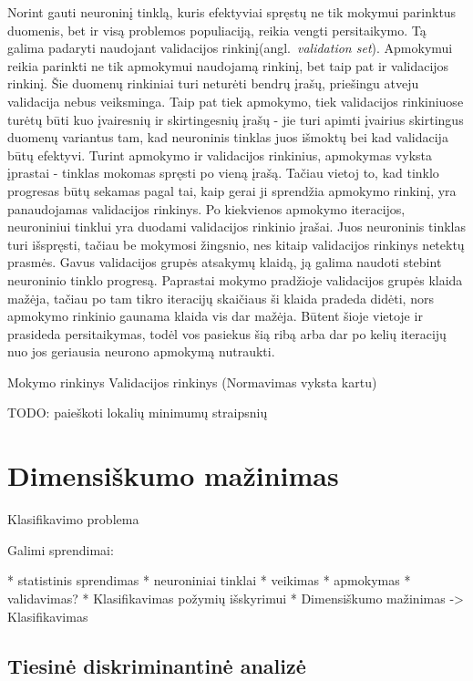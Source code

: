 \documentclass{VUMIFPSbakalaurinis}
\newcommand{\TODO}[1]{
\colorbox{todo-background-color}{TODO: #1}
}
\begin{document}
Norint gauti neuroninį tinklą, kuris efektyviai spręstų ne tik mokymui parinktus duomenis, bet ir visą problemos populiaciją, reikia vengti persitaikymo.
Tą galima padaryti naudojant validacijos rinkinį(angl.~\textit{validation set}).
Apmokymui reikia parinkti ne tik apmokymui naudojamą rinkinį, bet taip pat ir validacijos rinkinį.
Šie duomenų rinkiniai turi neturėti bendrų įrašų, priešingu atveju validacija nebus veiksminga.
Taip pat tiek apmokymo, tiek validacijos rinkiniuose turėtų būti kuo įvairesnių ir skirtingesnių įrašų - jie turi apimti įvairius skirtingus duomenų variantus tam, kad neuroninis tinklas juos išmoktų bei kad validacija būtų efektyvi.
Turint apmokymo ir validacijos rinkinius, apmokymas vyksta įprastai - tinklas mokomas spręsti po vieną įrašą.
Tačiau vietoj to, kad tinklo progresas būtų sekamas pagal tai, kaip gerai ji sprendžia apmokymo rinkinį, yra panaudojamas validacijos rinkinys.
Po kiekvienos apmokymo iteracijos, neuroniniui tinklui yra duodami validacijos rinkinio įrašai.
Juos neuroninis tinklas turi išspręsti, tačiau be mokymosi žingsnio, nes kitaip validacijos rinkinys netektų prasmės.
Gavus validacijos grupės atsakymų klaidą, ją galima naudoti stebint neuroninio tinklo progresą.
Paprastai mokymo pradžioje validacijos grupės klaida mažėja, tačiau po tam tikro iteracijų skaičiaus ši klaida pradeda didėti, nors apmokymo rinkinio gaunama klaida vis dar mažėja.
Būtent šioje vietoje ir prasideda persitaikymas, todėl vos pasiekus šią ribą arba dar po kelių iteracijų nuo jos geriausia neurono apmokymą nutraukti.


Mokymo rinkinys
Validacijos rinkinys (Normavimas vyksta kartu)

\TODO{paieškoti lokalių minimumų straipsnių}




\section{Dimensiškumo mažinimas}

Klasifikavimo problema

Galimi sprendimai:

	* statistinis sprendimas
	* neuroniniai tinklai
		* veikimas
		* apmokymas
		* validavimas?
		* Klasifikavimas požymių išskyrimui
		* Dimensiškumo mažinimas -> Klasifikavimas

\subsection{Tiesinė diskriminantinė analizė}
\end{document}
